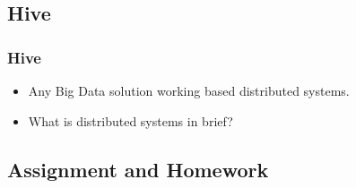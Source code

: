 
\subsection{Hive}
\begin{frame}
\frametitle{Hive}
\begin{itemize}[<+->]
	\item Any Big Data solution working based distributed systems.
	\item What is distributed systems in brief?
\end{itemize}
\end{frame}

\subsection{Assignment and Homework}